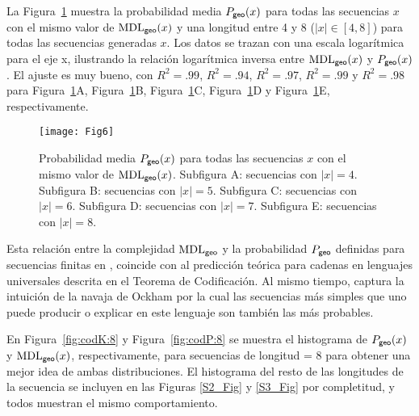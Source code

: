 La Figura~\ref{fig:codR} muestra la probabilidad media $P_{{\sf geo}}(x)$ para todas las secuencias $x$ con el mismo valor de ${\rm MDL}_{{\sf geo}}(x)$ y una longitud entre 4 y 8 ($|x| \in \left[4,8 \right]$) para todas las secuencias generadas $x$. Los datos se trazan con una escala logarítmica para el eje x, ilustrando la relación logarítmica inversa entre ${\rm MDL}_{{\sf geo}}(x)$ y $P_{{\sf geo}}(x)$. El ajuste es muy bueno, con $R^2=.99$, $R^2=.94$, $R^2=.97$, $R^2=.99$ y $R^2=.98$ para Figura~\ref{fig:codR}A, Figura~\ref{fig:codR}B, Figura~\ref{fig:codR}C, Figura~\ref{fig:codR}D y Figura~\ref{fig:codR}E, respectivamente.

\begin{figure}[!ht]
    \centering
    \texttt{[image: Fig6]}
    \caption{Probabilidad media $P_{{\sf geo}}(x)$ para todas las secuencias $x$ con el mismo valor de ${\rm MDL}_{{\sf geo}}(x)$.
    Subfigura A: secuencias con $|x| = 4$.
    Subfigura B: secuencias con $|x| = 5$.
    Subfigura C: secuencias con $|x| = 6$.
    Subfigura D: secuencias con $|x| = 7$.
    Subfigura E: secuencias con $|x| = 8$.}
    \label{fig:codR}
\end{figure}


Esta relación entre la complejidad ${\rm MDL}_{{\sf geo}}$ y la probabilidad $P_{{\sf geo}}$ definidas para secuencias finitas en \gramgeo, coincide con al predicción teórica para cadenas en lenguajes universales descrita en el Teorema de Codificación. Al mismo tiempo, captura la intuición de la navaja de Ockham por la cual las secuencias más simples que uno puede producir o explicar en este lenguaje son también las más probables.


En Figura~\ref{fig:codK:8} y Figura~\ref{fig:codP:8} se muestra el histograma de $P_{{\sf geo}}(x)$ y ${\rm MDL}_{{\sf geo}}(x)$, respectivamente, para secuencias de longitud = 8 para obtener una mejor idea de ambas distribuciones. El histograma del resto de las longitudes de la secuencia se incluyen en las Figuras \ref{S2_Fig} y \ref{S3_Fig} por completitud, y todos muestran el mismo comportamiento.

